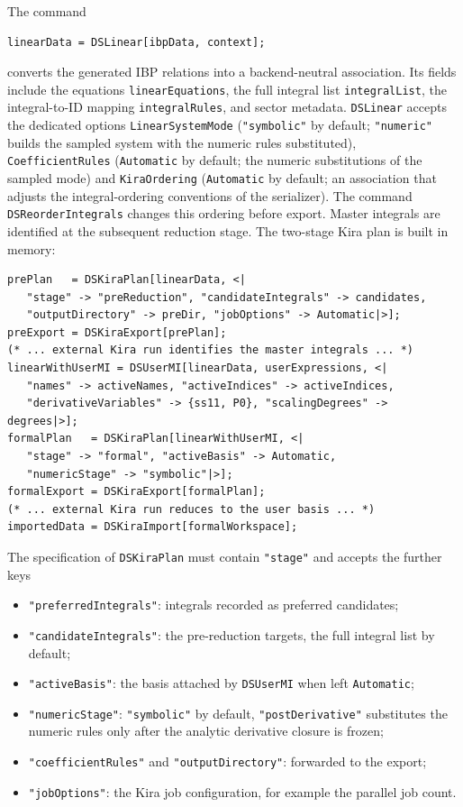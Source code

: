 \documentclass[11pt,a4paper]{article}
\begin{document}
The command
\begin{verbatim}
linearData = DSLinear[ibpData, context];
\end{verbatim}
converts the generated IBP relations into a backend-neutral association.
Its fields include the equations \texttt{linearEquations}, the full integral
list \texttt{integralList}, the integral-to-ID mapping \texttt{integralRules}, and sector metadata.
\texttt{DSLinear} accepts the dedicated options \texttt{LinearSystemMode} (\texttt{"symbolic"} by
default; \texttt{"numeric"} builds the sampled system with the numeric rules substituted),
\texttt{CoefficientRules} (\texttt{Automatic} by default; the numeric substitutions of the sampled
mode) and \texttt{KiraOrdering} (\texttt{Automatic} by default; an association that adjusts the
integral-ordering conventions of the serializer).
The command \texttt{DSReorderIntegrals} changes this ordering before export. Master integrals
are identified at the subsequent reduction stage. The two-stage Kira plan is built in memory:
\begin{samepage}
\begin{verbatim}
prePlan   = DSKiraPlan[linearData, <|
   "stage" -> "preReduction", "candidateIntegrals" -> candidates,
   "outputDirectory" -> preDir, "jobOptions" -> Automatic|>];
preExport = DSKiraExport[prePlan];
(* ... external Kira run identifies the master integrals ... *)
linearWithUserMI = DSUserMI[linearData, userExpressions, <|
   "names" -> activeNames, "activeIndices" -> activeIndices,
   "derivativeVariables" -> {ss11, P0}, "scalingDegrees" -> degrees|>];
formalPlan   = DSKiraPlan[linearWithUserMI, <|
   "stage" -> "formal", "activeBasis" -> Automatic,
   "numericStage" -> "symbolic"|>];
formalExport = DSKiraExport[formalPlan];
(* ... external Kira run reduces to the user basis ... *)
importedData = DSKiraImport[formalWorkspace];
\end{verbatim}
\end{samepage}
The specification of \texttt{DSKiraPlan} must contain \texttt{"stage"} and accepts the further keys
\begin{itemize}
\item \texttt{"preferredIntegrals"}: integrals recorded as preferred candidates;
\item \texttt{"candidateIntegrals"}: the pre-reduction targets, the full integral list by default;
\item \texttt{"activeBasis"}: the basis attached by \texttt{DSUserMI} when left \texttt{Automatic};
\item \texttt{"numericStage"}: \texttt{"symbolic"} by default, \texttt{"postDerivative"}
substitutes the numeric rules only after the analytic derivative closure is frozen;
\item \texttt{"coefficientRules"} and \texttt{"outputDirectory"}: forwarded to the export;
\item \texttt{"jobOptions"}: the Kira job configuration, for example the parallel job count.
\end{itemize}
\end{document}
